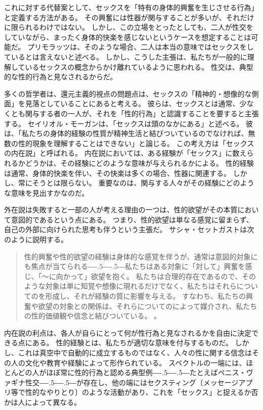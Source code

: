 \documentclass[paper=a4,book,openany]{jlreq}
\newcommand{\ig}[1]{}           %
\def\DDASH{―\kern-.5\zw―\kern-.5\zw―} %
\begin{document}
これに対する代替案として、セックスを「特有の身体的興奮を生じさせる行為」と定義する方法がある。
その興奮には性器が関与することが多いが、それだけに限られるわけではない\citep{janssen02:_sexual_inhib_sis1,janssen02:_sexual_inhib_sis2}。
しかし、この立場をとったとしても、二人が性交をしていながら、まったく身体的快楽を感じないというケースを想定することは可能だ。
プリモラッツは、そのような場合、二人は本当の意味ではセックスをしているとは言えないと述べる\citep[pp. 47--49]{primoratz99:_ethic_and_sex}。
しかし、こうした主張は、私たちが一般的に理解しているセックスの概念からかけ離れているように思われる。
性交は、典型的な性的行為と見なされるからだ。

多くの哲学者は、還元主義的視点の問題点は、セックスの「精神的・想像的な側面」を見落としていることにあると考える。
彼らは、セックスとは通常、少なくとも関与する者の一人が、それを「性的行為」と認識することを要すると主張する。
セイリオル・モーガン\ig{セイリオル・モーガン}は、「セックスは頭のなかにある」と述べる。
彼は、「私たちの身体的経験の性質が精神生活と結びついているのでなければ、無数の性的現象を理解することはできない」と論じる\citep[p.5]{morgan03:_sex_in_head}。
この考え方は「セックスの内在説」と呼ばれる。
内在説においては、ある経験が「セックス」に数えられるかどうかは、その経験にどのような意味が与えられるかによる。
性的経験は通常、身体的快楽を伴い、その快楽は多くの場合、性器に関連する。
しかし、常にそうとは限らない。
重要なのは、関与する人々がその経験にどのような意味を見出すかなのだ。

外在説は失敗すると一部の人が考える理由の一つは、性的欲望がその本質において意図的であるという点にある。
つまり、性的欲望は単なる感覚に留まらず、自己の外部に向けられた思考も伴うという主張だ。
サシャ・セットガストは次のように説明する。
\begin{quote}
  性的興奮や性的欲望の経験は身体的な感覚を伴うが、通常は意図的対象にも焦点が当てられる{\DDASH}私たちはある対象に「対して」興奮を感じ、「～に向かって」欲望を抱く。
私たちは合理的存在であるので、そのような対象は単に知覚や想像に現れるだけでなく、私たちはそれらについてのを形成し、それが経験の質に影響を与える。
すなわち、私たちの興奮や欲望の対象との関係は、それらについてのによって媒介され、私たちの性的価値観や信念と結びついている。  \citep[p. 384, 強調は原文]{settegast18:_prost_good_sex}。
\end{quote}

内在説の利点は、各人が自らにとって何が性行為と見なされるかを自由に決定できる点にある。
性的経験とは、私たちが適切な意味を付与するものだ。
しかし、これは真空中で自動的に成立するものではなく、人々の性に関する信念はその人の文化や教育や経験によって形作られている。
スペクトルの一端には、ほとんどの人がほぼ常に性的行為と認める典型例{\DDASH}たとえばペニス・ヴァギナ性交{\DDASH}が存在し、他の端にはセクスティング〔メッセージアプリ等で性的なやりとり〕のような活動があり、これを「セックス」と捉えるか否かは人によって異なる。
\end{document}
